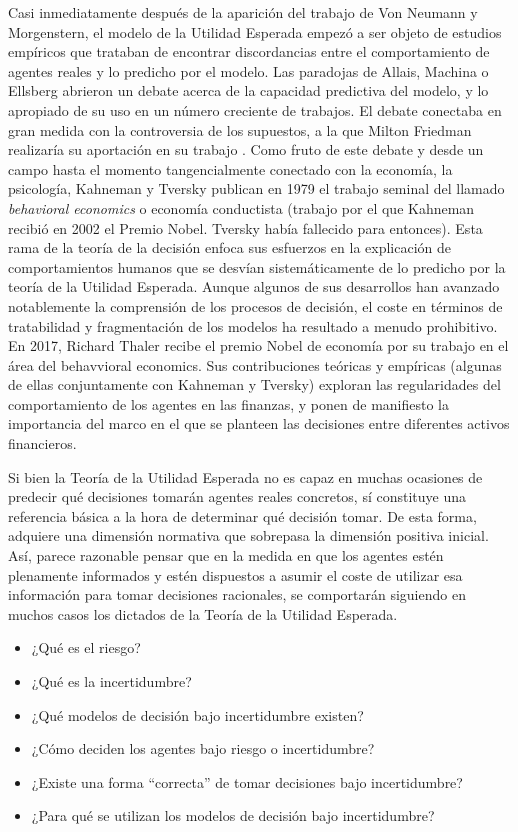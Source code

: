 \documentclass{nuevotema}
\begin{document}
Casi inmediatamente después de la aparición del trabajo de Von Neumann y Morgenstern, el modelo de la Utilidad Esperada empezó a ser objeto de estudios empíricos que trataban de encontrar discordancias entre el comportamiento de agentes reales y lo predicho por el modelo. Las paradojas de Allais, Machina o Ellsberg abrieron un debate acerca de la capacidad predictiva del modelo, y lo apropiado de su uso en un número creciente de trabajos. El debate conectaba en gran medida con la controversia de los supuestos, a la que Milton Friedman realizaría su aportación en su trabajo . Como fruto de este debate y desde un campo hasta el momento tangencialmente conectado con la economía, la psicología, Kahneman y Tversky publican en 1979 el trabajo seminal del llamado \textit{behavioral economics} o economía conductista (trabajo por el que Kahneman recibió en 2002 el Premio Nobel. Tversky había fallecido para entonces). Esta rama de la teoría de la decisión enfoca sus esfuerzos en la explicación de comportamientos humanos que se desvían sistemáticamente de lo predicho por la teoría de la Utilidad Esperada. Aunque algunos de sus desarrollos han avanzado notablemente la comprensión de los procesos de decisión, el coste en términos de tratabilidad y fragmentación de los modelos ha resultado a menudo prohibitivo. En 2017, Richard Thaler recibe el premio Nobel de economía por su trabajo en el área del behavvioral economics. Sus contribuciones teóricas y empíricas (algunas de ellas conjuntamente con Kahneman y Tversky) exploran las regularidades del comportamiento de los agentes en las finanzas, y ponen de manifiesto la importancia del marco en el que se planteen las decisiones entre diferentes activos financieros.

Si bien la Teoría de la Utilidad Esperada no es capaz en muchas ocasiones de predecir qué decisiones tomarán agentes reales concretos, sí constituye una referencia básica a la hora de determinar qué decisión  tomar. De esta forma, adquiere una dimensión normativa que sobrepasa la dimensión positiva inicial. Así, parece razonable pensar que en la medida en que los agentes estén plenamente informados y estén dispuestos a asumir el coste de utilizar esa información para tomar decisiones racionales, se comportarán siguiendo en muchos casos los dictados de la Teoría de la Utilidad Esperada.

\begin{itemize}
    \item ¿Qué es el riesgo?
    \item ¿Qué es la incertidumbre?
    \item ¿Qué modelos de decisión bajo incertidumbre existen?
    \item ¿Cómo deciden los agentes bajo riesgo o incertidumbre?
    \item ¿Existe una forma ``correcta'' de tomar decisiones bajo incertidumbre?
    \item ¿Para qué se utilizan los modelos de decisión bajo incertidumbre?
\end{itemize}
\end{document}
